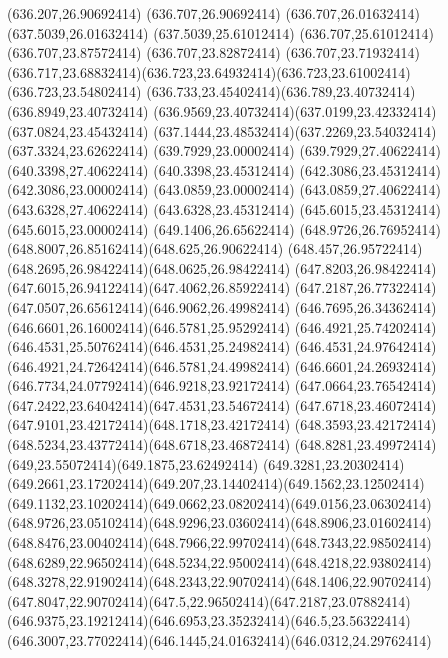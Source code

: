 {{	\lineto(636.207,26.90692414)
	\lineto(636.707,26.90692414)
	\lineto(636.707,26.01632414)
	\lineto(637.5039,26.01632414)
	\lineto(637.5039,25.61012414)
	\lineto(636.707,25.61012414)
	\lineto(636.707,23.87572414)
	\lineto(636.707,23.82872414)
	\lineto(636.707,23.71932414)
	\curveto(636.717,23.68832414)(636.723,23.64932414)(636.723,23.61002414)
	\lineto(636.723,23.54802414)
	\curveto(636.733,23.45402414)(636.789,23.40732414)(636.8949,23.40732414)
	\curveto(636.9569,23.40732414)(637.0199,23.42332414)(637.0824,23.45432414)
	\curveto(637.1444,23.48532414)(637.2269,23.54032414)(637.3324,23.62622414)
	\closepath
	\moveto(639.7929,23.00002414)
	\lineto(639.7929,27.40622414)
	\lineto(640.3398,27.40622414)
	\lineto(640.3398,23.45312414)
	\lineto(642.3086,23.45312414)
	\lineto(642.3086,23.00002414)
	\closepath
	\moveto(643.0859,23.00002414)
	\lineto(643.0859,27.40622414)
	\lineto(643.6328,27.40622414)
	\lineto(643.6328,23.45312414)
	\lineto(645.6015,23.45312414)
	\lineto(645.6015,23.00002414)
	\closepath
	\moveto(649.1406,26.65622414)
	\curveto(648.9726,26.76952414)(648.8007,26.85162414)(648.625,26.90622414)
	\curveto(648.457,26.95722414)(648.2695,26.98422414)(648.0625,26.98422414)
	\curveto(647.8203,26.98422414)(647.6015,26.94122414)(647.4062,26.85922414)
	\curveto(647.2187,26.77322414)(647.0507,26.65612414)(646.9062,26.49982414)
	\curveto(646.7695,26.34362414)(646.6601,26.16002414)(646.5781,25.95292414)
	\curveto(646.4921,25.74202414)(646.4531,25.50762414)(646.4531,25.24982414)
	\curveto(646.4531,24.97642414)(646.4921,24.72642414)(646.5781,24.49982414)
	\curveto(646.6601,24.26932414)(646.7734,24.07792414)(646.9218,23.92172414)
	\curveto(647.0664,23.76542414)(647.2422,23.64042414)(647.4531,23.54672414)
	\curveto(647.6718,23.46072414)(647.9101,23.42172414)(648.1718,23.42172414)
	\curveto(648.3593,23.42172414)(648.5234,23.43772414)(648.6718,23.46872414)
	\curveto(648.8281,23.49972414)(649,23.55072414)(649.1875,23.62492414)
	\lineto(649.3281,23.20302414)
	\curveto(649.2661,23.17202414)(649.207,23.14402414)(649.1562,23.12502414)
	\curveto(649.1132,23.10202414)(649.0662,23.08202414)(649.0156,23.06302414)
	\curveto(648.9726,23.05102414)(648.9296,23.03602414)(648.8906,23.01602414)
	\curveto(648.8476,23.00402414)(648.7966,22.99702414)(648.7343,22.98502414)
	\curveto(648.6289,22.96502414)(648.5234,22.95002414)(648.4218,22.93802414)
	\curveto(648.3278,22.91902414)(648.2343,22.90702414)(648.1406,22.90702414)
	\curveto(647.8047,22.90702414)(647.5,22.96502414)(647.2187,23.07882414)
	\curveto(646.9375,23.19212414)(646.6953,23.35232414)(646.5,23.56322414)
	\curveto(646.3007,23.77022414)(646.1445,24.01632414)(646.0312,24.29762414)
}}
